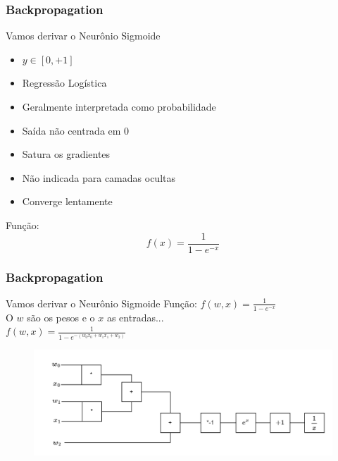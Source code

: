 \documentclass{beamer}
\begin{document}
\begin{frame}
	\frametitle{Backpropagation}
	\begin{block}{Vamos derivar o Neurônio Sigmoide}
		\begin{itemize}
			\item $y \in [0, + 1]$
			\item Regressão Logística
			\item Geralmente interpretada como probabilidade
			\item Saída não centrada em $0$
			\item Satura os gradientes
			\item Não indicada para camadas ocultas
			\item Converge lentamente
		\end{itemize}
		Função:
		$$f(x) = \frac{1}{1-e^{-x}}$$
	\end{block}
\end{frame}
\begin{frame}
	\frametitle{Backpropagation}
	\begin{block}{Vamos derivar o Neurônio Sigmoide}
		Função:
		$f(w, x) = \frac{1}{1-e^{-x}}$ \\ 
		O $w$ são os pesos e o $x$ as entradas... \\
		$f(w, x) = \frac{1}{1-e^{-(w_0x_0 + w_1x_1 + w_2)}}$
		\begin{figure}
			\centering
			\includegraphics[width=0.7\linewidth]{figures/sigmoidneuron_derivative}
		\end{figure}
		
	\end{block}
\end{frame}
\end{document}
